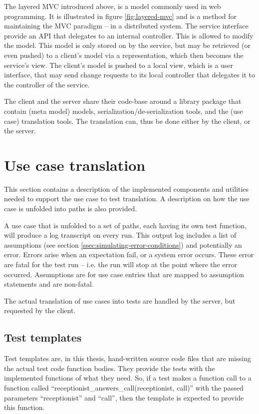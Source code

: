 \noindent The layered MVC introduced above, is a model commonly used in web programming. It is illustrated in figure \ref{fig:layered-mvc} and is a method for maintaining the MVC paradigm -- in a distributed system. The service interface provide an API that delegates to an internal controller. This is allowed to modify the model. This model is only stored on by the service, but may be retrieved (or even pushed) to a client's model via a representation, which then becomes the service's view. The client's model is pushed to a local view, which is a user interface, that may send change requests to its local controller that delegates it to the controller of the service.\medskip

\noindent The client and the server share their code-base around a library package that contain (meta model) models, serialization/de-serialization tools, and the (use case) translation tools. The translation can, thus be done either by the client, or the server.

\section{Use case translation}
This section contains a description of the implemented components and utilities needed to support the use case to test translation. A description on how the use case is unfolded into paths is also provided.\medskip

\noindent A use case that is unfolded to a set of paths, each having its own test function, will produce a log transcript on every run. This output log includes a list of assumptions (see section \ref{ssec:simulating-error-conditions}) and potentially an error. Errors arise when an expectation fail, or a system error occurs. These error are fatal for the test run -- i.e. the run will stop at the point where the error occurred. Assumptions are for use case entries that are mapped to assumption statements and are non-fatal.\medskip

\noindent The actual translation of use cases into tests are handled by the server, but requested by the client.

\subsection{Test templates}
Test templates are, in this thesis, hand-written source code files that are missing the actual test code function bodies. They provide the tests with the implemented functions of what they need. So, if a test makes a function call to a function called ``receptionist\_answers\_call(receptionist, call)'' with the passed parameters ``receptionist'' and ``call'', then the template is expected to provide this function.\medskip

